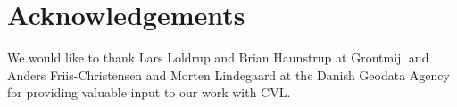 \section{Acknowledgements}
We would like to thank Lars Loldrup and Brian Haunstrup at Grontmij, and Anders Friis-Christensen and Morten Lindegaard at the Danish Geodata Agency for providing valuable input to our work with CVL.